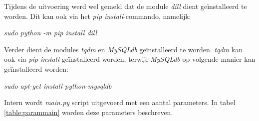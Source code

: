 Tijdens de uitvoering werd wel gemeld dat de module \textit{dill} dient geïnstalleerd te worden. Dit kan ook via het \textit{pip install}-commando, namelijk:

\begin{center}
	\textit{sudo python -m pip install dill}
\end{center}

Verder dient de modules \textit{tqdm} en \textit{MySQLdb} geïnstalleerd te worden. \textit{tqdm} kan ook via \textit{pip install} geïnstalleerd worden, terwijl \textit{MySQLdb} op volgende manier kan geïnstalleerd worden:

\begin{center}
	\textit{sudo apt-get install python-mysqldb}
\end{center}

Intern wordt \textit{main.py} script uitgevoerd met een aantal parameters. In tabel \ref{table:parammain} worden deze parameters beschreven.

